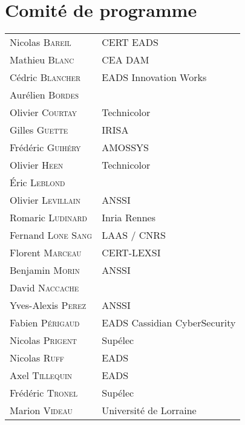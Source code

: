 \section*{Comité de programme}
\begin{tabular}{@{}p{5cm}@{}p{6.5cm}@{}}
  Nicolas \textsc{Bareil}         & CERT EADS                             \\
  Mathieu \textsc{Blanc}          & CEA DAM                               \\
  Cédric \textsc{Blancher}        & EADS Innovation Works                 \\
  Aurélien \textsc{Bordes}        &                                       \\
  Olivier \textsc{Courtay}        & Technicolor                           \\
  Gilles \textsc{Guette}          & IRISA                                 \\
  Frédéric \textsc{Guihéry}      & AMOSSYS                               \\
  Olivier \textsc{Heen}           & Technicolor                           \\
  Éric \textsc{Leblond}           &                                       \\
  Olivier \textsc{Levillain}      & ANSSI                                 \\
  Romaric \textsc{Ludinard}       & Inria Rennes                          \\
  Fernand \textsc{Lone Sang}      & LAAS / CNRS                           \\
  Florent \textsc{Marceau}        & CERT-LEXSI                            \\
  Benjamin \textsc{Morin}         & ANSSI                                 \\
  David \textsc{Naccache}         &                                       \\
  Yves-Alexis \textsc{Perez}      & ANSSI                                 \\
  Fabien \textsc{Périgaud}        & EADS Cassidian CyberSecurity          \\
  Nicolas \textsc{Prigent}        & Sup\'elec                             \\
  Nicolas \textsc{Ruff}           & EADS                                  \\
  Axel \textsc{Tillequin}         & EADS                                  \\
  Fr\'ed\'eric \textsc{Tronel}    & Sup\'elec                             \\
  Marion \textsc{Videau}          & Université de Lorraine                \\
\end{tabular}

